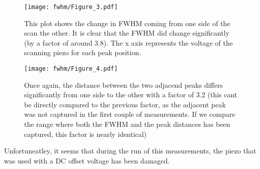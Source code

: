 \begin{figure}[H]
    \centering
    \texttt{[image: fwhm/Figure\_3.pdf]}
    \caption{This plot shows the change in FWHM coming from one side of the scan the other. It is clear that the FWHM did change significantly (by a factor of around 3.8). The x axis represents the voltage of the scanning piezo for each peak position.}
\end{figure}


\begin{figure}[H]
    \centering
    \texttt{[image: fwhm/Figure\_4.pdf]}
    \caption{Once again, the distance between the two adjacend peaks differs significantly from one side to the other with a factor of 3.2 (this cant be directly compared to the previous factor, as the adjacent peak was not captured in the first couple of measurements. If we compare the range where both the FWHM and the peak distances has been captured, this factor is nearly identical)}
\end{figure}

Unfortuneatley, it seems that during the run of this measurements, the piezo that was used with a DC offset voltage has been damaged. 

